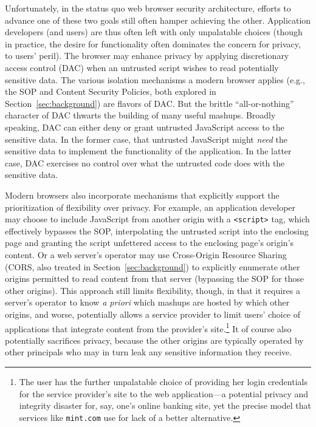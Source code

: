 Unfortunately, in the status quo web browser security architecture,
efforts to advance one of these two goals still often hamper achieving
the other. Application developers (and users) are thus often left with
only unpalatable choices (though in practice, the desire for
functionality often dominates the concern for privacy, to users'
peril). The browser may enhance privacy by applying discretionary
access control (DAC) when an untrusted script wishes to read
potentially sensitive data. The various isolation mechanisms a modern
browser applies (e.g., the SOP and Content Security Policies,
both explored in Section~\ref{sec:background}) are flavors of DAC. But
the brittle ``all-or-nothing'' character of DAC thwarts the building
of many useful mashups. Broadly speaking, DAC can either deny or grant
untrusted JavaScript access to the sensitive data. In the former case,
that untrusted JavaScript might {\em need} the sensitive data to
implement the functionality of the application. In the latter case,
DAC exercises no control over what the untrusted code does with the
sensitive data.

Modern browsers also incorporate mechanisms that explicitly support
the prioritization of flexibility over privacy. For example, an
application developer may choose to include JavaScript from another
origin with a {\tt <script>} tag, which effectively bypasses the SOP,
interpolating the untrusted script into the enclosing page and
granting the script unfettered access to the enclosing page's origin's
content. Or a web server's operator may use Cross-Origin Resource
Sharing (CORS, also treated in Section~\ref{sec:background}) to
explicitly enumerate other origins permitted to read content from that
server (bypassing the SOP for those other origins). This approach
still limits flexibility, though, in that it requires a server's
operator to know {\em a priori} which mashups are hosted by which
other origins, and worse, potentially allows a service provider to
limit users' choice of applications that integrate content from the
provider's site.\footnote{The user has the further unpalatable
  choice of providing her login credentials for the service
  provider's site to the web application---a potential
  privacy and integrity disaster for, say, one's online banking site,
  yet the precise model that services like {\tt mint.com} use for lack
  of a better alternative.} It of course also potentially sacrifices
privacy, because the other origins are typically operated by other
principals who may in turn leak any sensitive information they
receive.

